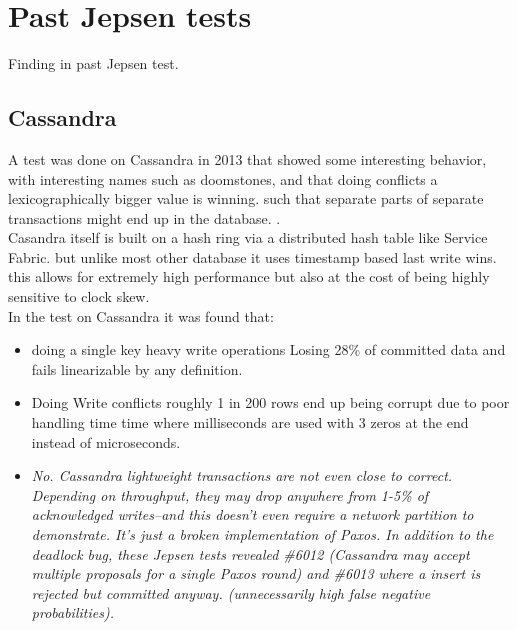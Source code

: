 \documentclass[a4paper,10pt,titlepage]{report}
\begin{document}


    
    
    
    

    \section{Past Jepsen tests}
        Finding in past Jepsen test.
    \subsection{Cassandra}
    A test was done on Cassandra in 2013 that showed some interesting behavior, with interesting names such as doomstones, and that doing conflicts a lexicographically bigger value is winning. such that separate parts of separate transactions might end up in the database. .\\
    \vspace{5mm}
    Casandra itself is built on a hash ring via a distributed hash table like Service Fabric. but unlike most other database it uses timestamp based last write wins. this allows for extremely high performance but also at the cost of being highly sensitive to clock skew.\\
    
    In the test on Cassandra it was found that:
    \begin{itemize}
        \item doing a single key heavy write operations Losing 28\% of committed data and fails linearizable by any definition.
        \item Doing Write conflicts roughly 1 in 200 rows end up being corrupt due to poor handling time time where milliseconds are used with 3 zeros at the end instead of microseconds.
        \item \textit{No. Cassandra lightweight transactions are not even close to correct. Depending on throughput, they may drop anywhere from 1-5\% of acknowledged writes–and this doesn’t even require a network partition to demonstrate. It’s just a broken implementation of Paxos. In addition to the deadlock bug, these Jepsen tests revealed \#6012 (Cassandra may accept multiple proposals for a single Paxos round) and \#6013 where a insert is rejected but committed anyway. (unnecessarily high false negative probabilities).}
    \end{itemize}
\end{document}
